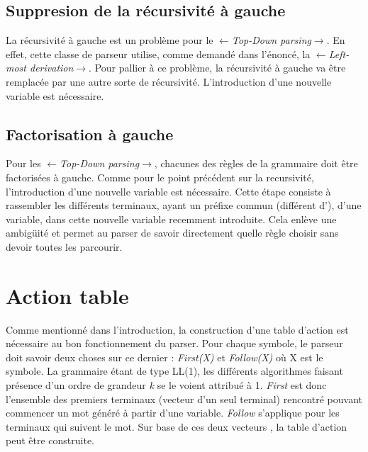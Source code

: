 \documentclass[pdftex,10pt,a4paper]{article} \usepackage[utf8]{inputenc}
\begin{document}
\subsection{Suppresion de la récursivité à gauche}
La récursivité à gauche est un problème pour le $\leftarrow$\textit{Top-Down parsing}$\rightarrow$. En effet, cette classe de parseur utilise, comme demandé dans l'énoncé, la $\leftarrow$\textit{Left-most derivation}$\rightarrow$. Pour pallier à ce problème, la récursivité à gauche va être remplacée par une autre sorte de récursivité. L'introduction d'une nouvelle variable est nécessaire.

\subsection{Factorisation à gauche}
Pour les $\leftarrow$\textit{Top-Down parsing}$\rightarrow$, chacunes des règles de la grammaire doit être factorisées à gauche. Comme pour le point précédent sur la recursivité, l'introduction d'une nouvelle variable est nécessaire. Cette étape consiste à rassembler les différents terminaux, ayant un préfixe commun (différent d'\epsilon), d'une variable, dans cette nouvelle variable recemment introduite. Cela enlève une ambigüité et permet au parser de savoir directement quelle règle choisir sans devoir toutes les parcourir.

\section{Action table}

Comme mentionné dans l'introduction, la construction d'une table d'action est nécessaire au bon fonctionnement du parser. Pour chaque symbole, le parseur doit savoir deux choses sur ce dernier : \textit{First(X)} et \textit{Follow(X)} où X est le symbole. La grammaire étant de type LL(1), les différents algorithmes faisant présence d'un ordre de grandeur \textit{k} se le voient attribué à 1. \textit{First} est donc l'ensemble des premiers terminaux (vecteur d'un seul terminal) rencontré pouvant commencer un mot généré à partir d'une variable. \textit{Follow} s'applique pour les terminaux qui suivent le mot. Sur base de ces deux vecteurs , la table d'action peut être construite.
\end{document}
